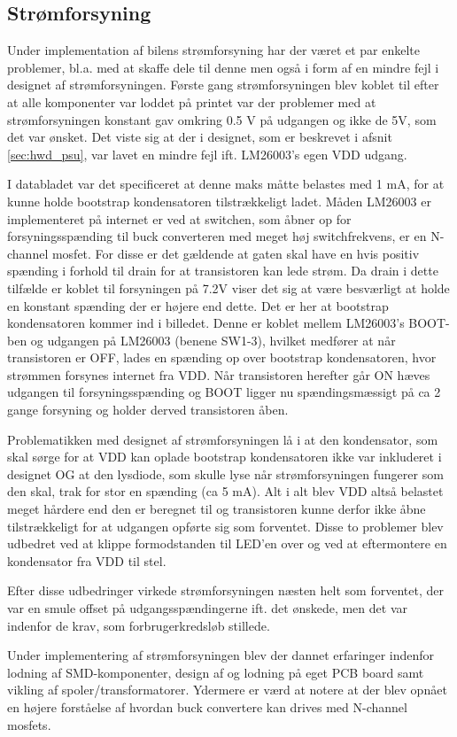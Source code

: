 \subsection{Strømforsyning}

Under implementation af bilens strømforsyning har der været et par enkelte problemer, bl.a. med at skaffe dele til denne men også i form af en mindre fejl i designet af strømforsyningen.
Første gang strømforsyningen blev koblet til efter at alle komponenter var loddet på printet var der problemer med at strømforsyningen konstant gav omkring 0.5 V på udgangen og ikke de 5V, som det var ønsket.
Det viste sig at der i designet, som er beskrevet i afsnit \ref{sec:hwd_psu}, var lavet en mindre fejl ift. LM26003's egen VDD udgang.

I databladet var det specificeret at denne maks måtte belastes med 1 mA, for at kunne holde bootstrap kondensatoren tilstrækkeligt ladet.
Måden LM26003 er implementeret på internet er ved at switchen, som åbner op for forsyningsspænding til buck converteren med meget høj switchfrekvens, er en N-channel mosfet.
For disse er det gældende at gaten skal have en hvis positiv spænding i forhold til drain for at transistoren kan lede strøm. 
Da drain i dette tilfælde er koblet til forsyningen på 7.2V viser det sig at være besværligt at holde en konstant spænding der er højere end dette.
Det er her at bootstrap kondensatoren kommer ind i billedet.
Denne er koblet mellem LM26003's BOOT-ben og udgangen på LM26003 (benene SW1-3), hvilket medfører at når transistoren er OFF, lades en spænding op over bootstrap kondensatoren, hvor strømmen forsynes internet fra VDD.
Når transistoren herefter går ON hæves udgangen til forsyningsspænding og BOOT ligger nu spændingsmæssigt på ca 2 gange forsyning og holder derved transistoren åben.

Problematikken med designet af strømforsyningen lå i at den kondensator, som skal sørge for at VDD kan oplade bootstrap kondensatoren ikke var inkluderet i designet OG at den lysdiode, som skulle lyse når strømforsyningen fungerer som den skal, trak for stor en spænding (ca 5 mA).
Alt i alt blev VDD altså belastet meget hårdere end den er beregnet til og transistoren kunne derfor ikke åbne tilstrækkeligt for at udgangen opførte sig som forventet.
Disse to problemer blev udbedret ved at klippe formodstanden til LED'en over og ved at eftermontere en kondensator fra VDD til stel.

Efter disse udbedringer virkede strømforsyningen næsten helt som forventet, der var en smule offset på udgangsspændingerne ift. det ønskede, men det var indenfor de krav, som forbrugerkredsløb stillede.

Under implementering af strømforsyningen blev der dannet erfaringer indenfor lodning af SMD-komponenter, design af og lodning på eget PCB board samt vikling af spoler/transformatorer. 
Ydermere er værd at notere at der blev opnået en højere forståelse af hvordan buck convertere kan drives med N-channel mosfets.
